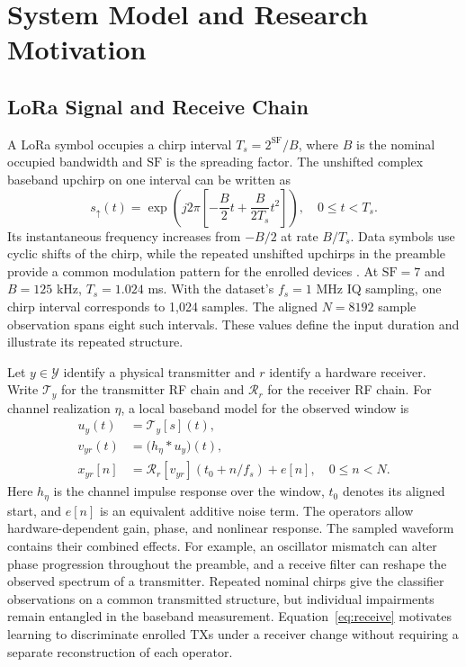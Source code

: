\documentclass[journal]{IEEEtran}
\begin{document}
\section{System Model and Research Motivation}
\subsection{LoRa Signal and Receive Chain}
A LoRa symbol occupies a chirp interval \(T_s=2^{\mathrm{SF}}/B\), where \(B\) is the nominal occupied bandwidth and \(\mathrm{SF}\) is the spreading factor. The unshifted complex baseband upchirp on one interval can be written as
\begin{equation}
 s_{\uparrow}(t)=\exp\!\left(j2\pi
 \left[-\frac{B}{2}t+\frac{B}{2T_s}t^2\right]\right),
 \quad 0\leq t<T_s .
 \label{eq:chirp}
\end{equation}
Its instantaneous frequency increases from \(-B/2\) at rate \(B/T_s\). Data symbols use cyclic shifts of the chirp, while the repeated unshifted upchirps in the preamble provide a common modulation pattern for the enrolled devices \cite{shen2022scalable,ma2025robust}. At \(\mathrm{SF}=7\) and \(B=125\) kHz, \(T_s=1.024\) ms. With the dataset's \(f_s=1\) MHz IQ sampling, one chirp interval corresponds to 1,024 samples. The aligned \(N=8192\) sample observation spans eight such intervals. These values define the input duration and illustrate its repeated structure.

Let \(y\in\mathcal Y\) identify a physical transmitter and \(r\) identify a hardware receiver. Write \(\mathcal T_y\) for the transmitter RF chain and \(\mathcal R_r\) for the receiver RF chain. For channel realization \(\eta\), a local baseband model for the observed window is
\begin{align}
 u_y(t)&=\mathcal T_y[s](t), \\
 v_{yr}(t)&=\big(h_{\eta}*u_y\big)(t),\\
 x_{yr}[n]&=\mathcal R_r[v_{yr}](t_0+n/f_s)+e[n],
 \quad 0\le n<N .
 \label{eq:receive}
\end{align}
Here \(h_{\eta}\) is the channel impulse response over the window, \(t_0\) denotes its aligned start, and \(e[n]\) is an equivalent additive noise term. The operators allow hardware-dependent gain, phase, and nonlinear response. The sampled waveform contains their combined effects. For example, an oscillator mismatch can alter phase progression throughout the preamble, and a receive filter can reshape the observed spectrum of a transmitter. Repeated nominal chirps give the classifier observations on a common transmitted structure, but individual impairments remain entangled in the baseband measurement. Equation~\eqref{eq:receive} motivates learning to discriminate enrolled TXs under a receiver change without requiring a separate reconstruction of each operator.
\end{document}
